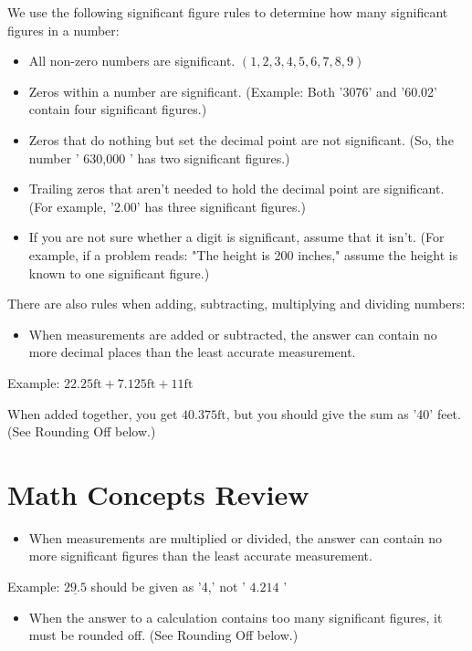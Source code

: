 \begin{enumerate}
We use the following significant figure rules to determine how many significant figures in a number:

\begin{itemize}
  \item All non-zero numbers are significant. $(1,2,3,4,5,6,7,8,9)$

  \item Zeros within a number are significant. (Example: Both '3076' and '60.02' contain four significant figures.)

  \item Zeros that do nothing but set the decimal point are not significant. (So, the number ' 630,000 ' has two significant figures.)

  \item Trailing zeros that aren't needed to hold the decimal point are significant. (For example, '2.00' has three significant figures.)

  \item If you are not sure whether a digit is significant, assume that it isn't. (For example, if a problem reads: "The height is 200 inches," assume the height is known to one significant figure.)

\end{itemize}
There are also rules when adding, subtracting, multiplying and dividing numbers:

\begin{itemize}
  \item When measurements are added or subtracted, the answer can contain no more decimal places than the least accurate measurement.
\end{itemize}
Example: $22.25 \mathrm{ft}+7.125 \mathrm{ft}+11 \mathrm{ft}$

When added together, you get $40.375 \mathrm{ft}$, but you should give the sum as '40' feet. (See Rounding Off below.)

\section{Math Concepts Review}
\begin{itemize}
  \item When measurements are multiplied or divided, the answer can contain no more significant figures than the least accurate measurement.
\end{itemize}
Example: $\underline{29.5}$ should be given as '4,' not ' $4.214$ '

\begin{itemize}
  \item When the answer to a calculation contains too many significant figures, it must be rounded off. (See Rounding Off below.)
\end{itemize}

\end{enumerate}
